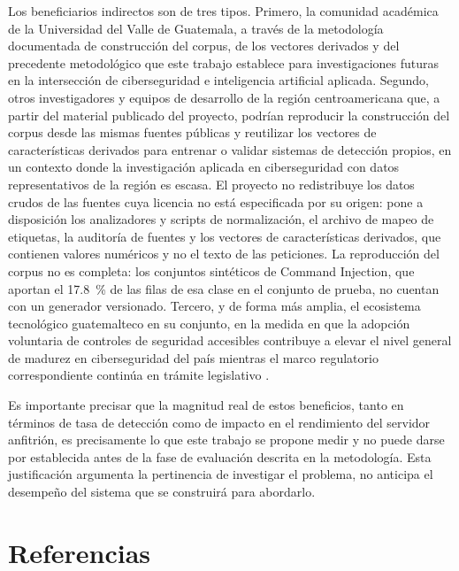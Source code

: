 Los beneficiarios indirectos son de tres tipos. Primero, la comunidad académica de la
Universidad del Valle de Guatemala, a través de la metodología documentada de construcción del corpus, de los vectores derivados y del precedente
metodológico que este trabajo establece para investigaciones futuras en la intersección de
ciberseguridad e inteligencia artificial aplicada. Segundo, otros investigadores y equipos de desarrollo de la región centroamericana que, a partir del
material publicado del proyecto, podrían reproducir la construcción del corpus desde las mismas
fuentes públicas y reutilizar los vectores de características derivados para entrenar o validar
sistemas de detección propios, en un contexto donde la investigación aplicada en ciberseguridad con
datos representativos de la región es escasa. El proyecto no redistribuye los datos crudos de las
fuentes cuya licencia no está especificada por su origen: pone a disposición los analizadores y
scripts de normalización, el archivo de mapeo de etiquetas, la auditoría de fuentes y los
vectores de características derivados, que contienen valores numéricos y no el texto de las
peticiones. La reproducción del corpus no es completa: los conjuntos sintéticos de Command
Injection, que aportan el 17.8~\% de las filas de esa clase en el conjunto de prueba, no cuentan
con un generador versionado. Tercero, y de forma
más amplia, el ecosistema tecnológico guatemalteco en su conjunto, en la medida en que la
adopción voluntaria de controles de seguridad accesibles contribuye a elevar el nivel general de
madurez en ciberseguridad del país mientras el marco regulatorio correspondiente continúa en
trámite legislativo \cite{lahora2026estancada}.

Es importante precisar que la magnitud real de estos beneficios, tanto en términos de tasa de
detección como de impacto en el rendimiento del servidor anfitrión, es precisamente lo que este
trabajo se propone medir y no puede darse por establecida antes de la fase de evaluación descrita
en la metodología. Esta justificación argumenta la pertinencia de investigar el problema, no
anticipa el desempeño del sistema que se construirá para abordarlo.

\ifdefined\modoensamble
\else
	\section*{Referencias}
	\printbibliography[heading=none]
	
\fi
